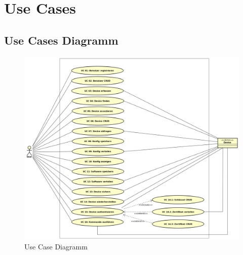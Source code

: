 \section{Use Cases}
\subsection{Use Cases Diagramm}
\begin{figure}[H]
\centering
\includegraphics[scale=0.425]{images/use_case_diagram.png}\caption{Use Case Diagramm}
\end{figure}
\newpage
